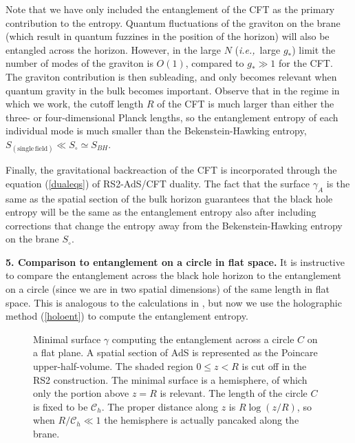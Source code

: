 \documentclass[12pt]{article}
\newcommand{\ie}{{\it i.e.,}\ }
\newcommand{\reef}[1]{(\ref{#1})}
\begin{document}
Note that we have only included the entanglement of the CFT as the
primary contribution to the entropy. Quantum fluctuations of the
graviton on the brane (which result in quantum fuzzines in the position
of the horizon) will also be entangled across the horizon. However, in
the large $N$ (\ie large $g_*$) limit the number of modes of the
graviton is $O(1)$, compared to $g_*\gg 1$ for the CFT. The graviton
contribution is then subleading, and only becomes relevant when quantum
gravity in the bulk becomes important. Observe that in the regime in
which we work, the cutoff length $R$ of the CFT is much larger than
either the three- or four-dimensional Planck lengths, so the
entanglement entropy of each individual mode is much smaller than the
Bekenstein-Hawking entropy, $S_{(\mathrm{single\, field})}\ll
S_{\circ}\simeq S_{BH}$.


Finally, the gravitational backreaction of the CFT is incorporated
through the equation \reef{dualeqs} of RS2-AdS/CFT duality. The fact that the
surface $\gamma_A$ is the same as the spatial section of the bulk
horizon guarantees that the black hole entropy will be the same as the
entanglement entropy also after including corrections that change the
entropy away from the Bekenstein-Hawking entropy on the brane $S_{\circ}$.


\bigskip

\noindent\textbf{5. Comparison to entanglement on a circle in flat
space.} It is instructive to compare the entanglement across the black
hole horizon to the entanglement on a circle (since we are in two
spatial dimensions) of the same length in flat space. This is analogous
to the calculations in \cite{bkls,sred}, but now we use the holographic
method \reef{holoent} to compute the entanglement entropy.

\begin{figure}%
\begin{center}\leavevmode  %
\epsfxsize=10cm 
\end{center}
\caption{\small Minimal surface $\gamma$ computing the entanglement
across a circle $C$ on a flat plane. A spatial section of AdS is
represented as the Poincare upper-half-volume.
The shaded region $0\leq z<R$ is cut off in the RS2 construction. The minimal
surface is a hemisphere, of which only the portion above $z=R$ is
relevant. The length of the circle $C$ is fixed to be $\mathcal{C}_{h}$.
The proper distance along $z$ is $R\log(z/R)$, so when
$R/\mathcal{C}_{h}\ll 1$ the hemisphere is actually pancaked along the
brane.
}
\label{fig:minsurf2}
\end{figure}
\end{document}
